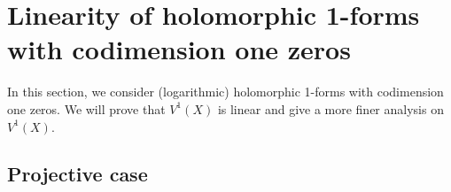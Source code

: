 \documentclass[a4paper,12pt,reqno]{amsart}
\theoremstyle{plain}
\theoremstyle{remark}
\begin{document}




\section{Linearity of holomorphic 1-forms with codimension one zeros}

In this section, we consider (logarithmic) holomorphic 1-forms with codimension one zeros. We will prove that $V^1(X)$ is linear and give a more finer analysis on $V^1(X)$. 

\subsection{Projective case}
\end{document}
